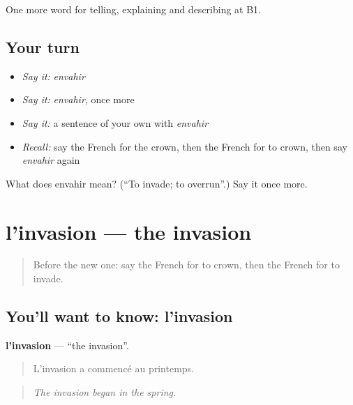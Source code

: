 \begin{grammarlens}[title={What you've built}]
One more word for telling, explaining and describing at B1.
\end{grammarlens}

\subsection*{Your turn}
\begin{itemize}
\raggedright
  \item \emph{Say it:} \emph{envahir}
  \item \emph{Say it:} \emph{envahir}, once more
  \item \emph{Say it:} a sentence of your own with \emph{envahir}
  \item \emph{Recall:} say the French for the crown, then the French for to crown, then say \emph{envahir} again
\end{itemize}

\begin{tcolorbox}[breakable,colback=teal!4,colframe=teal!35!black,title={Before you move on}]
What does envahir mean? (\textquotedblleft{}To invade; to overrun\textquotedblright{}.) Say it once more.
\end{tcolorbox}
\section[l'invasion]{l'invasion — the invasion}

\label{lesson:FR-C324-invasion}



\begin{quote}
Before the new one: say the French for to crown, then the French for to invade.
\end{quote}

\subsection*{You'll want to know: l'invasion}
\textbf{l'invasion} — \textquotedblleft{}the invasion\textquotedblright{}.

\begin{quote}
L'invasion a commencé au printemps.
\end{quote}

\begin{quote}
\emph{The invasion began in the spring.}
\end{quote}


